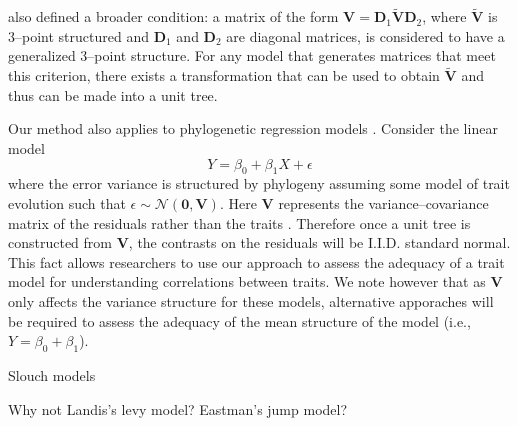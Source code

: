 \documentclass[a4paper,11pt]{article}
\begin{document}
\citet{Ho2014} also defined a broader condition: a matrix of the form $\mathbf{V}=\mathbf{D}_1 \widetilde{\mathbf{V}}\mathbf{D}_2$, where $\widetilde{\mathbf{V}}$ is 3--point structured and $\mathbf{D}_1$ and $\mathbf{D}_2$ are diagonal matrices, is considered to have a generalized 3--point structure. For any model that generates matrices that meet this criterion, there exists a transformation that can be used to obtain $\widetilde{\mathbf{V}}$ and thus can be made into a unit tree. 

Our method also applies to phylogenetic regression models \citep{Grafen1989, MartinsHansen1997}. Consider the linear model
\[Y = \beta_0 + \beta_1 X + \epsilon\]
where the error variance is structured by phylogeny assuming some model of trait evolution such that $\epsilon \sim \mathcal{N}(\mathbf{0}, \mathbf{V})$. Here $\mathbf{V}$ represents the variance--covariance matrix of the residuals rather than the traits \citep{Rohlf2001}. Therefore once a unit tree is constructed from $\mathbf{V}$, the contrasts on the residuals will be I.I.D. standard normal. This fact allows researchers to use our approach to assess the adequacy of a trait model for understanding correlations between traits. We note however that as $\mathbf{V}$ only affects the variance structure for these models, alternative apporaches \citep[see for example][ch. 6]{Gelman2003} will be required to assess the adequacy of the mean structure of the model (i.e., $Y = \beta_0 + \beta_1$).

Slouch models

Why not Landis's levy model? Eastman's jump model?

 
\newpage



\newpage
\end{document}
